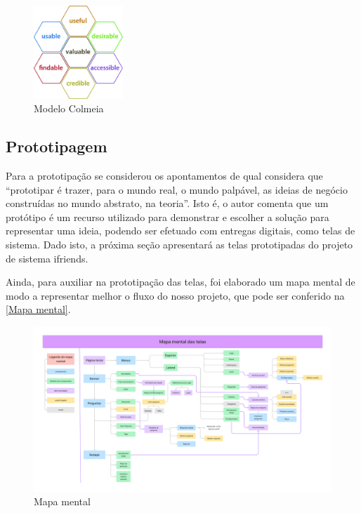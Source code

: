 \begin{figure}[htb]
\centering
\caption{Modelo Colmeia}
\includegraphics[width=0.3\textwidth]{anexos/Imagens_Proposta/modelo_colmeia.jpg}
\end{figure}
\FloatBarrier

\subsection{Prototipagem}
Para a prototipação se considerou os apontamentos de  qual considera que ``prototipar é trazer, para o mundo real, o mundo palpável, as ideias de negócio construídas no mundo abstrato, na teoria''. Isto é, o autor comenta que um protótipo é um recurso utilizado para demonstrar e escolher a solução para representar uma ideia, podendo ser efetuado com entregas digitais, como telas de sistema. Dado isto, a próxima seção apresentará as telas prototipadas do projeto de sistema \gls{ifriends}.

Ainda, para auxiliar na prototipação das telas, foi elaborado um mapa mental de modo a representar melhor o fluxo do nosso projeto, que pode ser conferido na \autoref{Mapa mental}.

\begin{figure}[htb]
\centering
\caption{\label{Mapa mental} Mapa mental}
\includegraphics[width=1\textwidth]{anexos/Imagens_Prototipo/Mapa_Mental.png}
\end{figure}
\FloatBarrier

